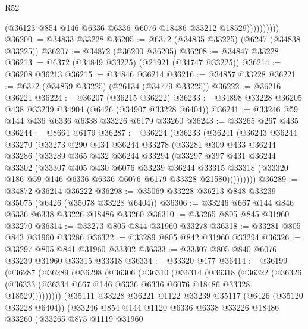 \begin{lexlean}{R52}
\begin{coremodule}
                      (@36123 @854 @146 @6336 @6336 @6076 @18486 @33212 @18529))))))))))
@36200 := @34833 @33228
@36205 := @6372 (@34835 @33225) (@6247 (@34838 @33225))
@36207 := @34872 (@36200 @36205)
@36208 := @34847 @33228
@36213 := @6372 (@34849 @33225) (@21921 (@34747 @33225))
@36214 := @36208 @36213
@36215 := @34846 @36214
@36216 := @34857 @33228
@36221 := @6372 (@34859 @33225) (@26134 (@34779 @33225))
@36222 := @36216 @36221
@36224 := @36207 (@36215 @36222)
@36233 := @34898 @33228 @36205 @438 @33239 @34904 (@6426 (@34907 @33228 @6404))
@36241 := @33246 @59 @144 @436 @6336 @6338 @33226 @6179 @33260
@36243 := @33265 @267 @435
@36244 := @8664 @6179
@36287 := @36224
    (@36233
      (@36241
        (@36243
          @36244
          @33270
          (@33273
            @290
            @434
            @36244
            @33278
            (@33281
              @309
              @433
              @36244
              @33286
              (@33289
                @365
                @432
                @36244
                @33294
                (@33297
                  @397
                  @431
                  @36244
                  @33302
                  (@33307
                    @405
                    @430
                    @6076
                    @33239
                    @36244
                    @33315
                    @33318
                    (@33320 @186 @59 @146 @6336 @6336 @6076 @6179 @33328 @21580)))))))))
@36289 := @34872 @36214 @36222
@36298 := @35069 @33228 @36213 @848 @33239 @35075 (@6426 (@35078 @33228 @6404))
@36306 := @33246 @667 @144 @846 @6336 @6338 @33226 @18486 @33260
@36310 := @33265 @805 @845 @31960 @33270
@36314 := @33273 @805 @844 @31960 @33278
@36318 := @33281 @805 @843 @31960 @33286
@36322 := @33289 @805 @842 @31960 @33294
@36326 := @33297 @805 @841 @31960 @33302
@36333 := @33307 @805 @840 @6076 @33239 @31960 @33315 @33318
@36334 := @33320 @477
@36414 := @36199
    (@36287
      (@36289
        (@36298
          (@36306
            (@36310
              (@36314
                (@36318
                  (@36322
                    (@36326
                      (@36333 (@36334 @667 @146 @6336 @6336 @6076 @18486 @33328 @18529)))))))))
        (@35111
          @33228
          @36221
          @1122
          @33239
          @35117
          (@6426 (@35120 @33228 @6404))
          (@33246
            @854
            @144
            @1120
            @6336
            @6338
            @33226
            @18486
            @33260
            (@33265
              @875
              @1119
              @31960

\end{coremodule}
\end{lexlean}
